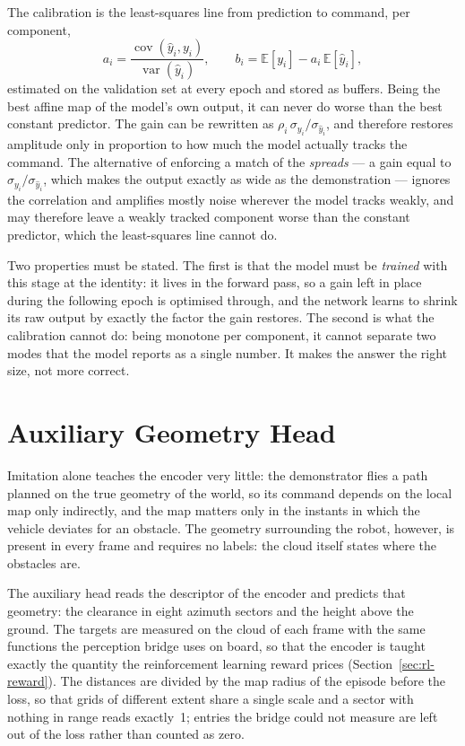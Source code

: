 The calibration is the least-squares line from prediction to command, per
component,
\begin{equation}
  a_i = \frac{\operatorname{cov}(\hat{y}_i, y_i)}{\operatorname{var}(\hat{y}_i)},
  \qquad
  b_i = \mathbb{E}[y_i] - a_i\,\mathbb{E}[\hat{y}_i],
\end{equation}
estimated on the validation set at every epoch and stored as buffers. Being the
best affine map of the model's own output, it can never do worse than the best
constant predictor. The gain can be rewritten as
$\rho_i\,\sigma_{y_i}/\sigma_{\hat{y}_i}$, and therefore restores amplitude only
in proportion to how much the model actually tracks the command. The alternative
of enforcing a match of the \emph{spreads} --- a gain equal to
$\sigma_{y_i}/\sigma_{\hat{y}_i}$, which makes the output exactly as wide as the
demonstration --- ignores the correlation and amplifies mostly noise wherever
the model tracks weakly, and may therefore leave a weakly tracked component
worse than the constant predictor, which the least-squares line cannot do.

Two properties must be stated. The first is that the model must be
\emph{trained} with this stage at the identity: it lives in the forward pass, so
a gain left in place during the following epoch is optimised through, and the
network learns to shrink its raw output by exactly the factor the gain restores.
The second is what the calibration cannot do: being monotone per component, it
cannot separate two modes that the model reports as a single number. It makes
the answer the right size, not more correct.

\section{Auxiliary Geometry Head}
\label{sec:geometry-head}

Imitation alone teaches the encoder very little: the demonstrator flies a path
planned on the true geometry of the world, so its command depends on the local
map only indirectly, and the map matters only in the instants in which the
vehicle deviates for an obstacle. The geometry surrounding the robot, however,
is present in every frame and requires no labels: the cloud itself states where
the obstacles are.

The auxiliary head reads the descriptor of the encoder and predicts that
geometry: the clearance in eight azimuth sectors and the height above the
ground. The targets are measured on the cloud of each frame with the same
functions the perception bridge uses on board, so that the encoder is taught
exactly the quantity the reinforcement learning reward prices
(Section~\ref{sec:rl-reward}). The distances are divided by the map radius of
the episode before the loss, so that grids of different extent share a single
scale and a sector with nothing in range reads exactly~\num{1}; entries the
bridge could not measure are left out of the loss rather than counted as zero.

